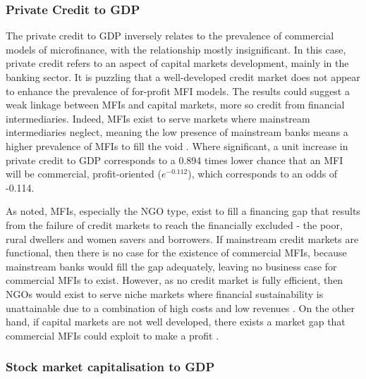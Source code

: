 \documentclass[a4paper,nobind]{templates/ociamthesis}
\begin{document}
\hypertarget{private-credit-to-gdp}{%
\subsubsection{Private Credit to GDP}\label{private-credit-to-gdp}}

The private credit to GDP inversely relates to the prevalence of commercial models of microfinance, with the relationship mostly insignificant. In this case, private credit refers to an aspect of capital markets development, mainly in the banking sector. It is puzzling that a well-developed credit market does not appear to enhance the prevalence of for-profit MFI models. The results could suggest a weak linkage between MFIs and capital markets, more so credit from financial intermediaries. Indeed, MFIs exist to serve markets where mainstream intermediaries neglect, meaning the low presence of mainstream banks means a higher prevalence of MFIs to fill the void \autocite{de2007economics}. Where significant, a unit increase in private credit to GDP corresponds to a 0.894 times lower chance that an MFI will be commercial, profit-oriented (\(e^{-0.112}\)), which corresponds to an odds of -0.114.

As noted, MFIs, especially the NGO type, exist to fill a financing gap that results from the failure of credit markets to reach the financially excluded - the poor, rural dwellers and women savers and borrowers. If mainstream credit markets are functional, then there is no case for the existence of commercial MFIs, because mainstream banks would fill the gap adequately, leaving no business case for commercial MFIs to exist. However, as no credit market is fully efficient, then NGOs would exist to serve niche markets where financial sustainability is unattainable due to a combination of high costs and low revenues \autocite{de2007economics}. On the other hand, if capital markets are not well developed, there exists a market gap that commercial MFIs could exploit to make a profit \autocite{d2013unsubsidized,armendariz2013subsidy}.

\hypertarget{stock-market-capitalisation-to-gdp}{%
\subsubsection{Stock market capitalisation to GDP}\label{stock-market-capitalisation-to-gdp}}
\end{document}
